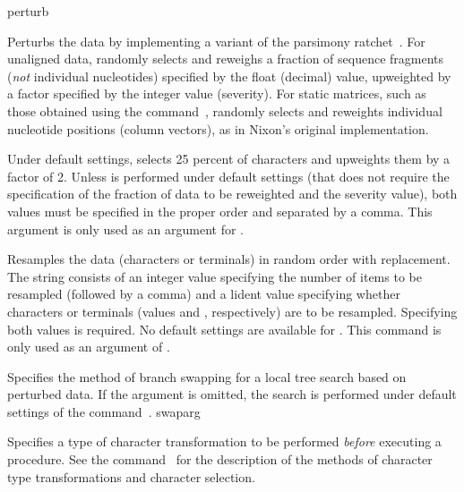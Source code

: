 \begin{command}{perturb}{}
\begin{arguments}
            {Perturbs the data by implementing a variant of the parsimony
            ratchet~\cite{Nixon1999}. For unaligned data,
             randomly selects and reweighs a fraction of
            sequence fragments (\emph{not} individual nucleotides) specified
            by the float
            (decimal) value, upweighted by a factor specified by the integer
            value (severity). For static matrices, such as those obtained
            using the command~, 
             randomly selects and
            reweights individual nucleotide positions (column vectors), as in Nixon's
            original implementation.
            
            Under default settings,
             selects 25 percent of characters and upweights
            them by a factor of 2.  Unless  is performed
            under default settings (that does not require the specification of the
            fraction of data to be reweighted and the severity value), both
            values must be specified in the proper order and separated by a comma.
            This argument is only used as an argument for .}
            {}

            {Resamples the data (characters or terminals) in random order with
            replacement. The  string consists of an 
            integer value
            specifying the number of items to be resampled (followed by a comma)
            and a lident value specifying whether characters or terminals
            (values  and , respectively)
            are to be resampled. Specifying both values
            is required. No default settings are available for . This
            command is only used as an argument of .}
            {}

            {Specifies the method of branch swapping for a local tree search
            based on perturbed data. If the argument 
            is omitted, the search is
            performed under default settings of the
            command~.}
            {swaparg}

            {Specifies a type of character transformation to be performed
            \emph{before} executing a  procedure.
            See the command~ for
            the description of the methods of character type transformations
            and character selection.}
            {}


\end{arguments}
\end{command}
